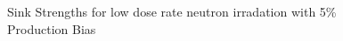 \documentclass[a4paper]{article}
\begin{document}
      \begin{figure}[h!]  %
        \centering
        \qquad
        \caption{Sink Strengths for low dose rate neutron irradation with 5\% Production Bias}
        \label{figure:sink_strengths_neutron_5_1e-6}
      \end{figure}
\end{document}
